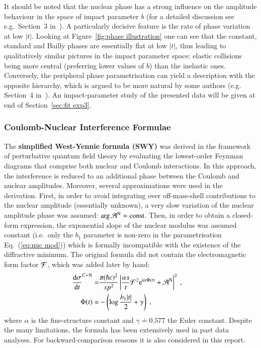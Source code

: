 It should be noted that the nuclear phase has a strong influence on the amplitude behaviour in the space of impact parameter $b$ (for a detailed discussion see e.g.~Section~3 in~\cite{klk02}). A particularly decisive feature is the rate of phase variation at low $|t|$. Looking at Figure~\ref{fig:phase illustration} one can see that the constant, standard and Bailly phases are essentially flat at low $|t|$, thus leading to qualitatively similar pictures in the impact parameter space: elastic collisions being more central (preferring lower values of $b$) than the inelastic ones. Conversely, the peripheral phase parametrisation can yield a description with the opposite hierarchy, which is argued to be more natural by some authors (e.g. Section~4 in~\cite{kl96}). An impact-parameter study of the presented data will be given at end of Section~\ref{sec:fit exp3}.

\subsubsection{Coulomb-Nuclear Interference Formulae}
\label{sec:cni interference}

The {\bf simplified West-Yennie formula (SWY)} \cite{wy68} was derived in the framework of perturbative quantum field theory by evaluating the lowest-order Feynman diagrams that comprise both nuclear and Coulomb interactions. In this approach, the interference is reduced to an additional phase between the Coulomb and nuclear amplitudes. Moreover, several approximations were used in the derivation. First, in order to avoid integrating over off-mass-shell contributions to the nuclear amplitude (essentially unknown), a very slow variation of the nuclear amplitude phase was assumed: $\arg {\cal A}^{\rm N} \approx \hbox{const}$. Then, in order to obtain a closed-form expression, the exponential slope of the nuclear modulus was assumed constant (i.e.~only the $b_1$ parameter is non-zero in the parametrisation Eq.~(\ref{eq:nuc mod})) which is formally incompatible with the existence of the diffractive minimum. The original formula did not contain the electromagnetic form factor ${\cal F}$, which was added later by hand:
\begin{equation}
\label{eq:int swy}
	\begin{aligned}
		{\d\sigma\over \d t}^{\rm C+N} =& {\pi (\hbar c)^2 \over s p^2} \left | {\alpha s\over t} {\cal F}^2 \e^{\I\alpha \Phi(t)} + {\cal A}^{\rm N}
			\right |^2\ ,\cr
		\Phi(t) =& - \left( \log {b_1 |t|\over 2} + \gamma \right)\ ,\cr
	\end{aligned}
\end{equation}
where $\alpha$ is the fine-structure constant and $\gamma \doteq 0.577$ the Euler constant. Despite the many limitations, the formula has been extensively used in past data analyses. For backward-comparison reasons it is also considered in this report.

